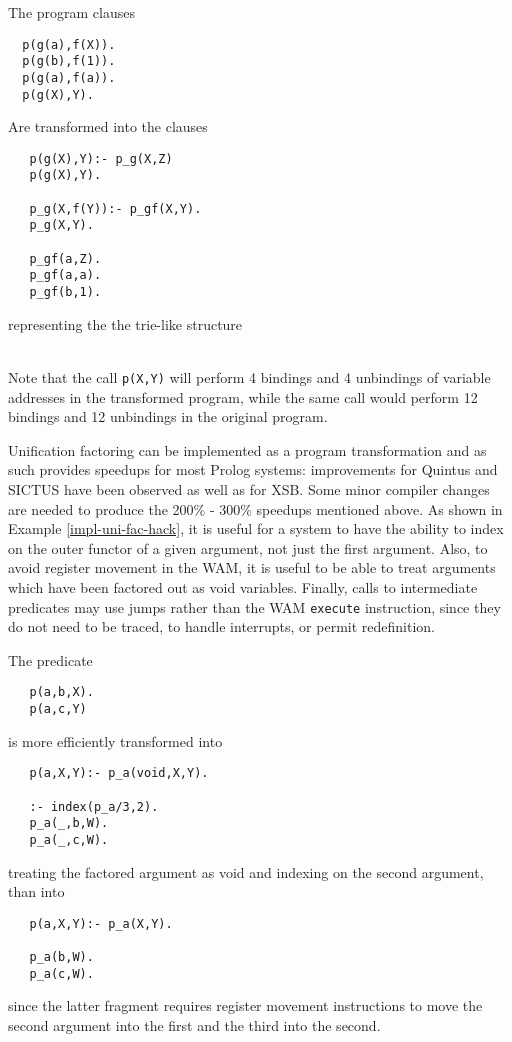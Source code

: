 \begin{example} \rm \label{impl-uni-fac}
The program clauses
\begin{verbatim}
  p(g(a),f(X)).        
  p(g(b),f(1)).       
  p(g(a),f(a)).       
  p(g(X),Y).   
\end{verbatim}
Are transformed into the clauses
\begin{verbatim}
   p(g(X),Y):- p_g(X,Z)
   p(g(X),Y).

   p_g(X,f(Y)):- p_gf(X,Y).
   p_g(X,Y).

   p_gf(a,Z).
   p_gf(a,a).
   p_gf(b,1).
\end{verbatim}
representing the the trie-like structure
\ \\
\begin{center}
\mbox{}
\end{center}
\ \\
Note that the call {\tt p(X,Y)} will perform 4 bindings and 4
unbindings of variable addresses in the transformed program, while the
same call would perform 12 bindings and 12 unbindings in the original
program.
\end{example}

Unification factoring can be implemented as a program transformation
and as such provides speedups for most Prolog systems: improvements
for Quintus and SICTUS have been observed as well as for XSB.  Some
minor compiler changes are needed to produce the 200\% - 300\%
speedups mentioned above.  As shown in Example
\ref{impl-uni-fac-hack}, it is useful for a system to have the
ability to index on the outer functor of a given argument, not just
the first argument.  Also, to avoid register movement in the WAM, it
is useful to be able to treat arguments which have been factored out
as void variables.  Finally, calls to intermediate predicates may use
jumps rather than the WAM {\tt execute} instruction, since they do
not need to be traced, to handle interrupts, or permit redefinition.

\begin{example} \rm \label{impl-uni-fac-hack}
The predicate
\begin{verbatim}
   p(a,b,X).
   p(a,c,Y)
\end{verbatim}
is more efficiently transformed into 
\begin{verbatim}
   p(a,X,Y):- p_a(void,X,Y).

   :- index(p_a/3,2).
   p_a(_,b,W).
   p_a(_,c,W).
\end{verbatim}
treating the factored argument as void and indexing on the
second argument, than into
\begin{verbatim}
   p(a,X,Y):- p_a(X,Y).

   p_a(b,W).
   p_a(c,W).
\end{verbatim}
\end{example}
since the latter fragment requires register movement
instructions to move the second argument into the first and the
third into the second.

